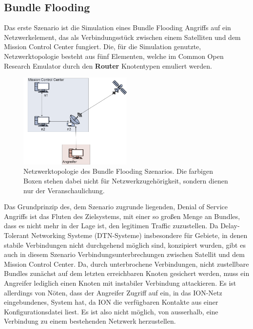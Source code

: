 \documentclass{article}
\begin{document}
\subsection{Bundle Flooding}
Das erste Szenario ist die Simulation eines Bundle Flooding Angriffs auf ein Netzwerkelement, das als Verbindungsstück zwischen einem Satelliten und dem Mission Control Center fungiert. Die, für die Simulation genutzte, Netzwerktopologie besteht aus fünf Elementen, welche im Common Open Research Emulator durch den \textbf{Router} Knotentypen emuliert werden.\par
\begin{figure}[h]
\centering
\includegraphics[width=0.5\textwidth]{flooding}
\caption{Netzwerktopologie des Bundle Flooding Szenarios. Die farbigen Boxen stehen dabei nicht für Netzwerkzugehörigkeit, sondern dienen nur der Veranschaulichung.}
\end{figure}
Das Grundprinzip des, dem Szenario zugrunde liegenden, Denial of Service Angriffs ist das Fluten des Zielsystems, mit einer so großen Menge an Bundles, dass es nicht mehr in der Lage ist, den legitimen Traffic zuzustellen. Da Delay-Tolerant Networking Systeme (DTN-Systeme) insbesondere für Gebiete, in denen stabile Verbindungen nicht durchgehend möglich sind, konzipiert wurden, gibt es auch in diesem Szenario Verbindungsunterbrechungen zwischen Satellit und dem Mission Control Center. Da, durch unterbrochene Verbindungen, nicht zustellbare Bundles zunächst auf dem letzten erreichbaren Knoten gesichert werden, muss ein Angreifer lediglich einen Knoten mit instabiler Verbindung attackieren. Es ist allerdings von Nöten, dass der Angreifer Zugriff auf ein, in das ION-Netz eingebundenes, System hat, da ION die verfügbaren Kontakte aus einer Konfigurationsdatei liest. Es ist also nicht möglich, von ausserhalb, eine Verbindung zu einem bestehenden Netzwerk herzustellen.\par
\end{document}
